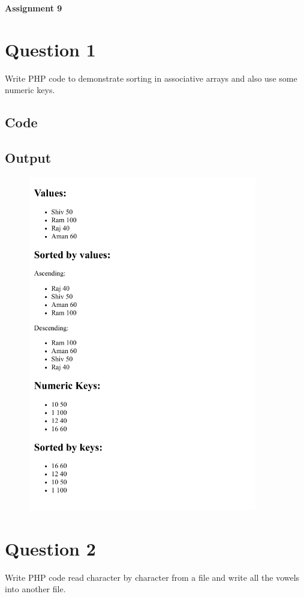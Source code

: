 \documentclass{article}
\begin{document}

{\centerline{\bfseries \Huge Assignment 9}}

\section*{Question 1}
Write PHP code to demonstrate sorting in associative arrays and
also use some numeric keys.
\subsection*{Code}

\newpage
\subsection*{Output}
\begin{figure}[H]
  \centering
  \includegraphics[width=10cm]{1/out.png}
\end{figure}

\newpage
\section*{Question 2}
Write PHP code read character by character from a file and write all
the vowels into another file.
\end{document}

